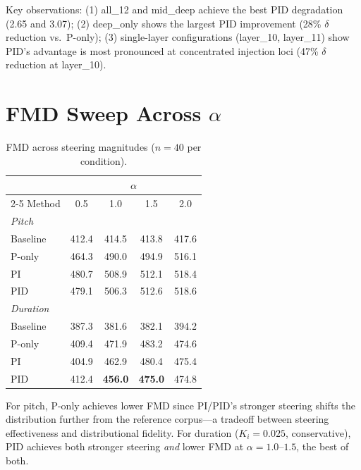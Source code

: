 \documentclass{article}
\theoremstyle{plain}
\begin{document}
Key observations: (1) all\_12 and mid\_deep achieve the best PID degradation (2.65 and 3.07); (2) deep\_only shows the largest PID improvement (28\% $\delta$ reduction vs.\ P-only); (3) single-layer configurations (layer\_10, layer\_11) show PID's advantage is most pronounced at concentrated injection loci (47\% $\delta$ reduction at layer\_10).

\section{FMD Sweep Across $\alpha$}
\label{app:fmd_sweep}

\begin{table}[h]
  \caption{FMD across steering magnitudes ($n{=}40$ per condition).}
  \label{tab:fmd_sweep}
  \begin{center}
  \begin{small}
  \begin{tabular}{lcccc}
    \toprule
    & \multicolumn{4}{c}{$\alpha$} \\
    \cmidrule(lr){2-5}
    Method & 0.5 & 1.0 & 1.5 & 2.0 \\
    \midrule
    \multicolumn{5}{l}{\textit{Pitch}} \\
    Baseline & 412.4 & 414.5 & 413.8 & 417.6 \\
    P-only & 464.3 & 490.0 & 494.9 & 516.1 \\
    PI & 480.7 & 508.9 & 512.1 & 518.4 \\
    PID & 479.1 & 506.3 & 512.6 & 518.6 \\
    \midrule
    \multicolumn{5}{l}{\textit{Duration}} \\
    Baseline & 387.3 & 381.6 & 382.1 & 394.2 \\
    P-only & 409.4 & 471.9 & 483.2 & 474.6 \\
    PI & 404.9 & 462.9 & 480.4 & 475.4 \\
    PID & 412.4 & \textbf{456.0} & \textbf{475.0} & 474.8 \\
    \bottomrule
  \end{tabular}
  \end{small}
  \end{center}
\end{table}

For pitch, P-only achieves lower FMD since PI/PID's stronger steering shifts the distribution further from the reference corpus---a tradeoff between steering effectiveness and distributional fidelity. For duration ($K_i{=}0.025$, conservative), PID achieves both stronger steering \emph{and} lower FMD at $\alpha{=}1.0$--$1.5$, the best of both.
\end{document}
